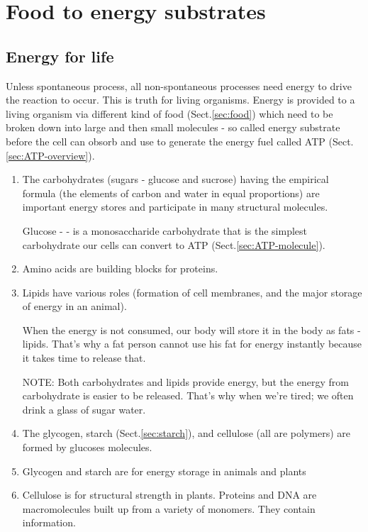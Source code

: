 
\chapter{Food to energy substrates}

\section{Energy for life}
\label{sec:energy-lifes-atp}

Unless spontaneous process, all non-spontaneous processes need energy to drive
the reaction to occur. This is truth for living organisms. Energy is provided to
a living organism via different kind of food (Sect.\ref{sec:food}) which need to
be broken down into large and then small molecules - so called energy substrate
before the cell can obsorb and use to generate the energy fuel called ATP
(Sect.\ref{sec:ATP-overview}).

\begin{enumerate}
  \item  The carbohydrates (sugars  -  glucose and sucrose) having the empirical
formula  (the elements of carbon and water in equal
proportions) are important energy stores and participate in many
structural molecules.  

Glucose  -   - is a monosaccharide carbohydrate that is the
simplest carbohydrate our cells can convert to ATP
(Sect.\ref{sec:ATP-molecule}).

  \item Amino acids are building blocks for proteins.

  \item Lipids have various roles (formation of cell membranes, and the major
  storage of energy in an animal).

When the energy is not consumed, our body will store it in the body as
fats - lipids. That's why a fat person cannot use his fat for energy
instantly because it takes time to release that. 

NOTE: Both carbohydrates and lipids provide energy, but the energy
from carbohydrate is easier to be released. That's why when we're
tired; we often drink a glass of sugar water. 

  \item The glycogen, starch (Sect.\ref{sec:starch}), and cellulose (all are polymers)
are formed by glucoses molecules.

  \item Glycogen and starch are for energy storage in animals and plants

  \item Cellulose is for structural strength in plants.  Proteins and
  DNA are macromolecules built up from a variety of monomers. They
  contain information.

\end{enumerate}

